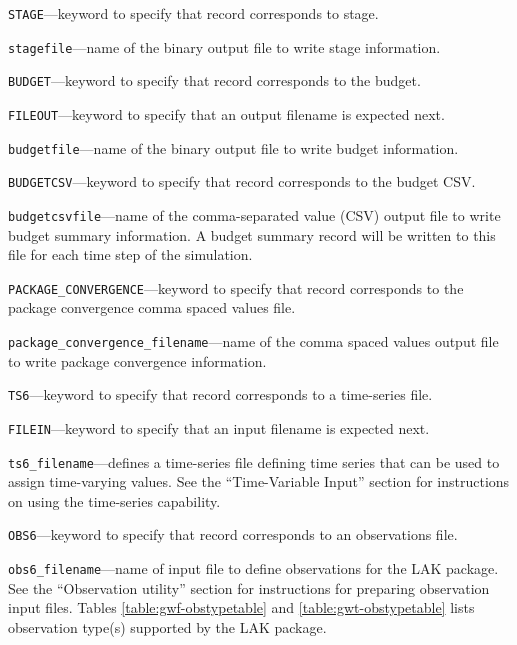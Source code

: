 \begin{description}
\item \texttt{STAGE}---keyword to specify that record corresponds to stage.

\item \texttt{stagefile}---name of the binary output file to write stage information.

\item \texttt{BUDGET}---keyword to specify that record corresponds to the budget.

\item \texttt{FILEOUT}---keyword to specify that an output filename is expected next.

\item \texttt{budgetfile}---name of the binary output file to write budget information.

\item \texttt{BUDGETCSV}---keyword to specify that record corresponds to the budget CSV.

\item \texttt{budgetcsvfile}---name of the comma-separated value (CSV) output file to write budget summary information.  A budget summary record will be written to this file for each time step of the simulation.

\item \texttt{PACKAGE\_CONVERGENCE}---keyword to specify that record corresponds to the package convergence comma spaced values file.

\item \texttt{package\_convergence\_filename}---name of the comma spaced values output file to write package convergence information.

\item \texttt{TS6}---keyword to specify that record corresponds to a time-series file.

\item \texttt{FILEIN}---keyword to specify that an input filename is expected next.

\item \texttt{ts6\_filename}---defines a time-series file defining time series that can be used to assign time-varying values. See the ``Time-Variable Input'' section for instructions on using the time-series capability.

\item \texttt{OBS6}---keyword to specify that record corresponds to an observations file.

\item \texttt{obs6\_filename}---name of input file to define observations for the LAK package. See the ``Observation utility'' section for instructions for preparing observation input files. Tables \ref{table:gwf-obstypetable} and \ref{table:gwt-obstypetable} lists observation type(s) supported by the LAK package.


\end{description}
